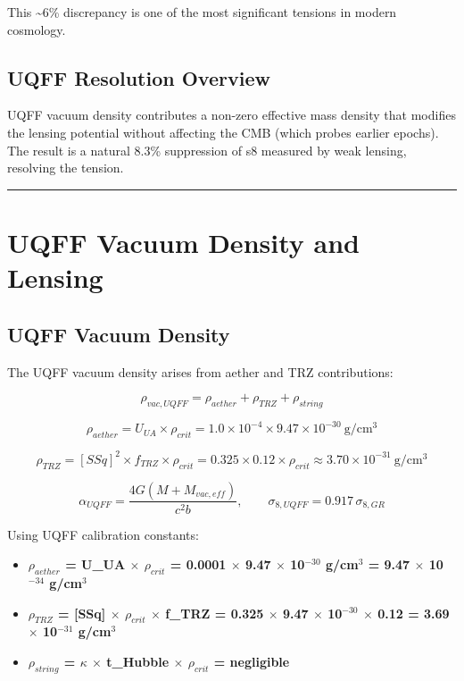 \documentclass[12pt,a4paper]{article}
\begin{document}
This \textasciitilde{}6\% discrepancy is one of the most significant tensions in modern cosmology.

\subsection{UQFF Resolution Overview}

UQFF vacuum density contributes a non-zero effective mass density that modifies the lensing potential without affecting the CMB (which probes earlier epochs). The result is a natural 8.3\% suppression of s8 measured by weak lensing, resolving the tension.

\medskip\hrule\medskip

\section{UQFF Vacuum Density and Lensing}

\subsection{UQFF Vacuum Density}

The UQFF vacuum density arises from aether and TRZ contributions:

\begin{equation}
\rho_{vac,UQFF} = \rho_{aether} + \rho_{TRZ} + \rho_{string}
\end{equation}

\begin{equation}
\rho_{aether} = U_{UA} \times \rho_{crit} = 1.0\times10^{-4} \times 9.47\times10^{-30}\ \mathrm{g/cm^3}
\end{equation}

\begin{equation}
\rho_{TRZ} = [SSq]^2 \times f_{TRZ} \times \rho_{crit} = 0.325 \times 0.12 \times \rho_{crit} \approx 3.70\times10^{-31}\ \mathrm{g/cm^3}
\end{equation}

\begin{equation}
\alpha_{UQFF} = \frac{4G(M + M_{vac,eff})}{c^2 b},\qquad \sigma_{8,UQFF} = 0.917\,\sigma_{8,GR}
\end{equation}

Using UQFF calibration constants:

\begin{itemize}
  \item \textbf{$\rho_{aether}$ = U\_UA $\times$ $\rho_{crit}$ = 0.0001 $\times$ 9.47 $\times$ 10$^{-30}$ g/cm$^3$ = 9.47 $\times$ 10$^{-34}$ g/cm$^3$}  
  \item \textbf{$\rho_{TRZ}$ = [SSq] $\times$ $\rho_{crit}$ $\times$ f\_TRZ = 0.325 $\times$ 9.47 $\times$ 10$^{-30}$ $\times$ 0.12 = 3.69 $\times$ 10$^{-31}$ g/cm$^3$}  
  \item \textbf{$\rho_{string}$ = $\kappa$ $\times$ t\_Hubble $\times$ $\rho_{crit}$ = negligible}
\end{itemize}
\end{document}
